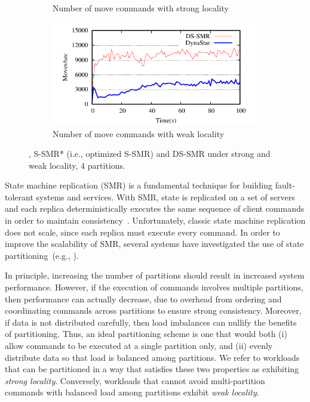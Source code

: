 \begin{figure}[ht!]
\begin{subfigure}[b]{0.45\textwidth}
  \caption{Number of move commands with strong locality}
  \end{subfigure}
  \begin{subfigure}[b]{0.45\textwidth}
    \centering
    \includegraphics[width=0.95\columnwidth]{figures/socc/socc-moves-weak-locality}
    \caption{Number of move commands with weak locality}
  \end{subfigure}
  \caption{\dynastar, S-SMR* (i.e., optimized S-SMR) and DS-SMR under strong and weak locality, 4 partitions.}
  \label{fig:motivation}
\end{figure}




State machine replication (SMR) is a fundamental technique for
building fault-tolerant systems and services. With SMR, state is
replicated on a set of servers and each replica deterministically
executes the same sequence of client commands in order to maintain
consistency~\cite{Lam78,Sch90}. Unfortunately, classic state machine replication does not
scale, since each replica must execute every command. In order to
improve the scalability of SMR, several systems have investigated the
use of state partitioning~(e.g., \cite{Aguilera:2007, bezerra2014ssmr,corbett2013spanner,Glendenning:2011kj,
  bli16edcc}).

In principle, increasing the number of partitions should result in
increased system performance. However, if the execution of commands involves
multiple partitions, then performance can
actually decrease, due to overhead from ordering and coordinating
commands across partitions to ensure strong consistency. Moreover, if
data is not distributed carefully, then load imbalances can nullify
the benefits of partitioning. Thus, an ideal partitioning scheme is
one that would both (i) allow commands to be executed at a single
partition only, and (ii) evenly distribute data so that load is
balanced among partitions.  We refer to workloads that can be
partitioned in a way that satisfies these two properties as exhibiting
\emph{strong locality}.
Conversely, workloads that cannot avoid multi-partition commands with balanced load among partitions exhibit \emph{weak locality}.

